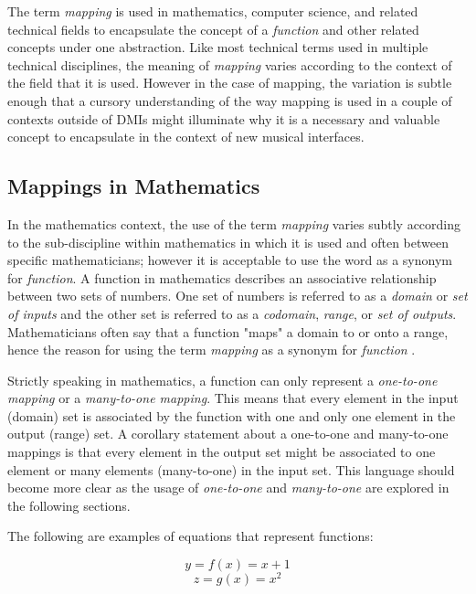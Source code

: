 The term \emph{mapping} is used in mathematics, computer science, and related technical fields to encapsulate the concept of a \emph{function} and other related concepts under one abstraction. Like most technical terms used in multiple technical disciplines, the meaning of \emph{mapping} varies according to the context of the field that it is used. However in the case of mapping, the variation is subtle enough that a cursory understanding of the way mapping is used in a couple of contexts outside of DMIs might illuminate why it is a necessary and valuable concept to encapsulate in the context of new musical interfaces.

\subsection{Mappings in Mathematics}
\label{sec:Mappings in Mathematics}

In the mathematics context, the use of the term \emph{mapping} varies subtly according to the sub-discipline within mathematics in which it is used and often between specific mathematicians; however it is acceptable to use the word as a synonym for \emph{function}. A function in mathematics describes an associative relationship between two sets of numbers. One set of numbers is referred to as a \emph{domain} or \emph{set of inputs} and the other set is referred to as a \emph{codomain}, \emph{range}, or \emph{set of outputs}. Mathematicians often say that a function "maps" a domain to or onto a range, hence the reason for using the term \emph{mapping} as a synonym for \emph{function} \cite{functionMapping}.

Strictly speaking in mathematics, a function can only represent a \emph{one-to-one mapping} or a \emph{many-to-one mapping}. This means that every element in the input (domain) set is associated by the function with one and only one element in the output (range) set. A corollary statement about a one-to-one and many-to-one mappings is that every element in the output set might be associated to one element or many elements (many-to-one) in the input set. This language should become more clear as the usage of \emph{one-to-one} and \emph{many-to-one} are explored in the following sections.

The following are examples of equations that represent functions:

\begin{equation} \label{eq1}
y = f(x) = x + 1
\end{equation}
\begin{equation} \label{eq2}
z = g(x) = x^{2}
\end{equation}

